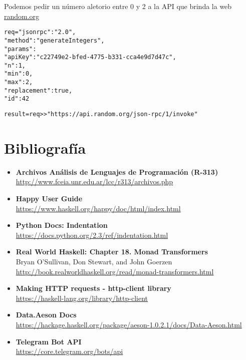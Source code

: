 \documentclass[12pt,a4paper,final]{article}
\begin{document}
\begin{description}
\begin{itemize}
\clearpage 
Podemos pedir un número aletorio entre 0 y 2 a la API que brinda la web \url{random.org}
\begin{alltt}
req = \textbraceleft "jsonrpc": "2.0",
        "method": "generateIntegers",
        "params":
         {\textbraceleft} "apiKey": "c22749e2-bfed-4775-b331-cca4e9d7d47c",
           "n": 1,
           "min": 0,
           "max": 2,
           "replacement": true {\textbraceright},
        "id": 42 \textbraceright 
        
result = req >> "https://api.random.org/json-rpc/1/invoke"
\end{alltt} 
\end{itemize}
\end{description}

\section{Bibliografía}

\begin{itemize}
\item \textbf{Archivos Análisis de Lenguajes de Programación (R-313)} \\
\url{http://www.fceia.unr.edu.ar/lcc/r313/archivos.php}
\item \textbf{Happy User Guide} \\
\url{https://www.haskell.org/happy/doc/html/index.html}
\item \textbf{Python Docs: Indentation} \\
\url{https://docs.python.org/2.3/ref/indentation.html}
\item \textbf{Real World Haskell: Chapter 18. Monad Transformers} \\
Bryan O'Sullivan, Don Stewart, and John Goerzen \\
\url{http://book.realworldhaskell.org/read/monad-transformers.html}
\item \textbf{Making HTTP requests - http-client library} \\
\url{https://haskell-lang.org/library/http-client}
\item \textbf{Data.Aeson Docs} \\
\url{https://hackage.haskell.org/package/aeson-1.0.2.1/docs/Data-Aeson.html}
\item \textbf{Telegram Bot API} \\
\url{https://core.telegram.org/bots/api}
\end{itemize}

\printindex
\end{document}
